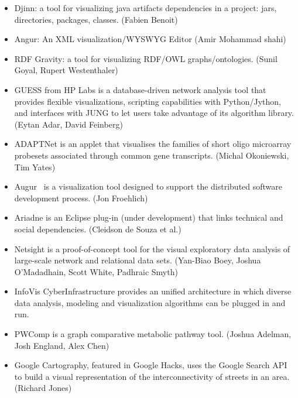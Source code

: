 \documentclass[a4paper,oneside]{article}
\begin{document}
\begin{enumerate}
\begin{itemize}
\item Djinn: a tool for visualizing java artifacts dependencies in a project: jars, directories, packages, classes. (Fabien Benoit)~\cite{DJINN}

\item Angur: An XML visualization/WYSWYG Editor (Amir Mohammad shahi)~\cite{ANGUR}

\item RDF Gravity: a tool for visualizing RDF/OWL graphs/ontologies. (Sunil Goyal, Rupert Westenthaler)~\cite{RDF_GRAVITY}

\item GUESS from HP Labs is a database-driven network analysis tool that provides flexible visualizations, scripting capabilities with Python/Jython, and interfaces with JUNG to let users take advantage of its algorithm library. (Eytan Adar, David Feinberg)~\cite{GUESS}

\item ADAPTNet is an applet that visualises the families of short oligo microarray probesets associated through common gene transcripts. (Michal Okoniewski, Tim Yates)~\cite{ADAPTNET}

\item Augur~\cite{AUGUR} is a visualization tool designed to support the distributed software development process. (Jon Froehlich)~\cite{AUGUR_2}

\item Ariadne is an Eclipse plug-in (under development) that links technical and social dependencies. (Cleidson de Souza et al.)~\cite{ARIADNE}

\item Netsight is a proof-of-concept tool for the visual exploratory data analysis of large-scale network and relational data sets. (Yan-Biao Boey, Joshua O'Madadhain, Scott White, Padhraic Smyth)~\cite{NETSIGHT}

\item InfoVis CyberInfrastructure provides an unified architecture in which diverse data analysis, modeling and visualization algorithms can be plugged in and run.~\cite{INFOVIS_CYBERINFRASTRUCTURE}

\item PWComp is a graph comparative metabolic pathway tool. (Joshua Adelman, Josh England, Alex Chen)~\cite{PWCOMP}

\item Google Cartography, featured in Google Hacks, uses the Google Search API to build a visual representation of the interconnectivity of streets in an area. (Richard Jones)~\cite{GOOGLE_CARTOGRAPHY}


\end{itemize}
\end{enumerate}
\end{document}
